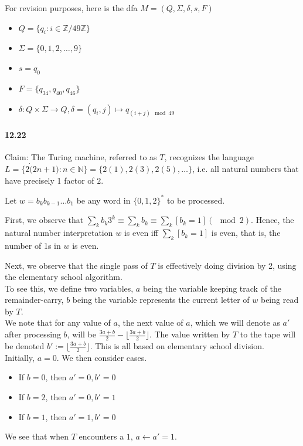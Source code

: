 \documentclass{article}
\begin{document}
For revision purposes, here is the dfa $M=(Q,\Sigma,\delta,s,F)$
\begin{itemize}
	\item $Q=\{q_i : i\in \mathbb{Z}/49\mathbb{Z}\}$
	\item $\Sigma=\{0,1,2,\dots,9\}$
	\item $s=q_0$
	\item $F=\{q_{34},q_{40},q_{46}\}$
	\item $\delta:Q\times \Sigma\rightarrow Q, \delta=(q_i, j)\mapsto q_{(i + j) \mod 49}$
\end{itemize}


\paragraph{12.22} Claim: The Turing machine, referred to as $T$, recognizes the language $L = \{2\dot (2n+1) : n\in \mathbb{N}\} = \{2(1), 2(3), 2(5),\dots \}$, i.e. all natural numbers that have precisely 1 factor of $2$.

Let $w = b_kb_{k-1}\dots b_1$ be any word in $\{0,1,2\}^*$ to be processed.

First, we observe that $\sum_{k}b_k3^k\equiv \sum_kb_k \equiv \sum_k [b_k=1] (\mod 2)$. Hence, the natural number interpretation $w$ is even iff $\sum_k [b_k=1]$ is even, that is, the number of 1s in $w$ is even.

Next, we observe that the single pass of $T$ is effectively doing division by 2, using the elementary school algorithm.\\
To see this, we define two variables, $a$ being the variable keeping track of the remainder-carry, $b$ being the variable represents the current letter of $w$ being read by $T$.\\
We note that for any value of $a$, the next value of $a$, which we will denote as $a'$ after processing $b$, will be $\frac{3a+b}{2}-\lfloor \frac{3a+b}{2} \rfloor$. The value written by $T$ to the tape will be denoted $b':=\lfloor \frac{3a+b}{2} \rfloor$. This is all based on elementary school division.\\
Initially, $a=0$. We then consider cases.
\begin{itemize}
	\item If $b=0$, then $a'=0, b'=0$
	\item If $b=2$, then $a'=0, b'=1$
	\item If $b=1$, then $a'=1, b'=0$
\end{itemize}
We see that when $T$ encounters a $1$, $a\gets a'=1$.
\end{document}
